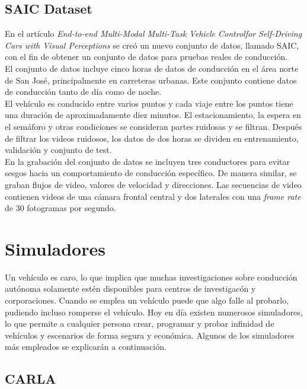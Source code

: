 \subsection{SAIC Dataset}

En el artículo \textit{End-to-end Multi-Modal Multi-Task Vehicle Controlfor Self-Driving Cars with Visual Perceptions} \cite{multi-modal} se creó un nuevo conjunto de datos, llamado SAIC, con el fin de obtener un conjunto de datos para pruebas reales de conducción.\\

El conjunto de datos incluye cinco horas de datos de conducción en el área norte de San José, principalmente en carreteras urbanas. Este conjunto contiene datos de conducción tanto de día como de noche. \\

El vehículo es conducido entre varios puntos y cada viaje entre los puntos tiene una duración de aproximadamente diez minutos. El estacionamiento, la espera en el semáforo y otras condiciones se consideran partes ruidosas y se filtran. Después de filtrar los videos ruidosos, los datos de dos horas se dividen en entrenamiento, validación y conjunto de test.\\

En la grabación del conjunto de datos se incluyen tres conductores para evitar sesgos hacia un comportamiento de conducción específico. De manera similar, se graban flujos de video, valores de velocidad y direcciones. Las secuencias de video contienen videos de una cámara frontal central y dos laterales con una \textit{frame rate} de 30 fotogramas por segundo.



\section{Simuladores}

Un vehículo es caro, lo que implica que muchas investigaciones sobre conducción autónoma solamente estén disponibles para centros de investigacón y corporaciones. Cuando se emplea un vehículo puede que algo falle al probarlo, pudiendo incluso romperse el vehículo. Hoy en día existen numerosos simuladores, lo que permite a cualquier persona crear, programar y probar infinidad de vehículos y escenarios de forma segura y económica. Algunos de los simuladores más empleados se explicarán a continuación.

\subsection{CARLA}

